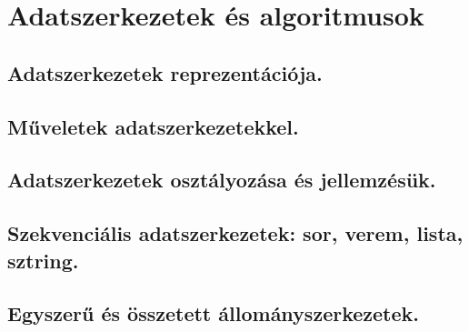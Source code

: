 \section{Adatszerkezetek és algoritmusok}
\subsection{Adatszerkezetek reprezentációja.}

\subsection{Műveletek adatszerkezetekkel.}

\subsection{Adatszerkezetek osztályozása és jellemzésük. }

\subsection{Szekvenciális adatszerkezetek: sor, verem, lista, sztring.}

\subsection{Egyszerű és összetett állományszerkezetek.}
